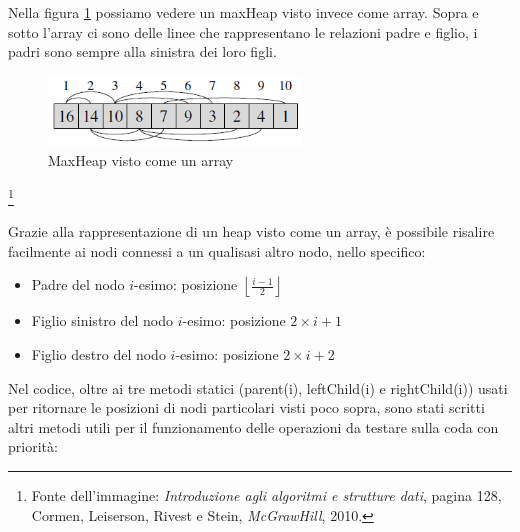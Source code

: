 \documentclass{article}
\begin{document}
Nella figura \ref{fig: Heap2} possiamo vedere un maxHeap visto invece come array. Sopra e sotto l'array ci sono delle linee che rappresentano le relazioni padre e figlio, i padri sono sempre alla sinistra dei loro figli.

\begin{figure}[H]
    \includegraphics[width=0.6\textwidth]{Images/Heap2.png}
    \centering
    \caption{MaxHeap visto come un array}
    \label{fig: Heap2}
\end{figure}

\footnote{Fonte dell'immagine: \textit{Introduzione agli algoritmi e strutture dati}, pagina 128, Cormen, Leiserson, Rivest e Stein, \emph{McGrawHill}, 2010.}

Grazie alla rappresentazione di un heap visto come un array, è possibile risalire facilmente ai nodi connessi a un qualisasi altro nodo, nello specifico:

\begin{itemize}
    
    \item Padre del nodo $i$-esimo: posizione $\left \lfloor{\frac{i-1}{2}}\right \rfloor$
    
    \item Figlio sinistro del nodo $i$-esimo: posizione $2\times i + 1$
    
    \item Figlio destro del nodo $i$-esimo: posizione $2\times i + 2$
\end{itemize}

Nel codice, oltre ai tre metodi statici (parent(i), leftChild(i) e rightChild(i)) usati per ritornare le posizioni di nodi particolari visti poco sopra, sono stati scritti altri metodi utili per il funzionamento delle operazioni da testare sulla coda con priorità:
\end{document}
